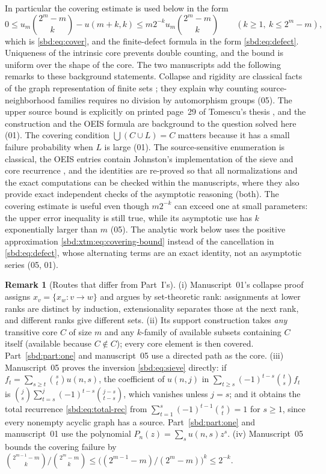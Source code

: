 \documentclass[11pt,a4paper]{article}
\theoremstyle{definition}
\newtheorem{remark}[theorem]{Remark}
\begin{document}
In particular the covering estimate is used below in the form
\begin{equation}\label{sbd:xtm:eq:covering-bound}
 0\le u_m\binom{2^m-m}k-u(m+k,k)
 \le m2^{-k}u_m\binom{2^m-m}k\qquad(k\ge1,\ k\le2^m-m),
\end{equation}
which is \eqref{sbd:eq:cover}, and the finite-defect formula in the form
\eqref{sbd:eq:defect}. Uniqueness of the intrinsic core prevents double
counting, and the bound is uniform over the shape of the core. The two
manuscripts add the following remarks to these background statements.
Collapse and rigidity are classical facts of the graph representation of
finite sets \cite{policriti,tomescu}; they explain why counting
source-neighborhood families requires no division by automorphism groups
(05). The upper source bound is explicitly on printed page~29 of Tomescu's
thesis \cite{tomescu}, and the construction and the OEIS formula are
background to the question solved here (01). The covering condition
$\bigcup(C\cup L)=C$ matters because it has a small failure probability
when $L$ is large (01). The source-sensitive enumeration is classical, the
OEIS entries contain Johnston's implementation of the sieve and core
recurrence \cite{oeis162,oeis1192}, and the identities are re-proved so
that all normalizations and the exact computations can be checked within
the manuscripts, where they also provide exact independent checks of the
asymptotic reasoning (both). The covering estimate is useful even though
$m2^{-k}$ can exceed one at small parameters: the upper error inequality
is still true, while its asymptotic use has $k$ exponentially larger than
$m$ (05). The analytic work below uses the positive approximation
\eqref{sbd:xtm:eq:covering-bound} instead of the cancellation in
\eqref{sbd:eq:defect}, whose alternating terms are an exact identity, not
an asymptotic series (05, 01).

\begin{remark}[Routes that differ from Part~I's]\label{sbd:xtm:rem:routes}
(i) Manuscript~01's collapse proof assigns $x_v=\{x_w:v\to w\}$ and argues
by set-theoretic rank: assignments at lower ranks are distinct by
induction, extensionality separates those at the next rank, and different
ranks give different sets. (ii) Its support construction takes \emph{any}
transitive core $C$ of size $m$ and any $k$-family of available subsets
containing $C$ itself (available because $C\notin C$); every core element
is then covered. Part~\ref{sbd:part:one} and manuscript~05 use a directed
path as the core. (iii) Manuscript~05 proves the inversion
\eqref{sbd:eq:sieve} directly: if $f_t=\sum_{s\ge t}\binom st u(n,s)$, the
coefficient of $u(n,j)$ in $\sum_{t\ge s}(-1)^{t-s}\binom ts f_t$ is
$\binom js\sum_{t=s}^j(-1)^{t-s}\binom{j-s}{t-s}$, which vanishes unless
$j=s$; and it obtains the total recurrence \eqref{sbd:eq:total-rec} from
$\sum_{t=1}^s(-1)^{t-1}\binom st=1$ for $s\ge1$, since every nonempty
acyclic graph has a source. Part~\ref{sbd:part:one} and manuscript~01 use
the polynomial $P_n(z)=\sum_su(n,s)z^s$. (iv) Manuscript~05 bounds the
covering failure by
$\binom{2^{m-1}-m}k/\binom{2^m-m}k\le\bigl((2^{m-1}-m)/(2^m-m)\bigr)^k\le2^{-k}$.
\end{remark}
\end{document}
